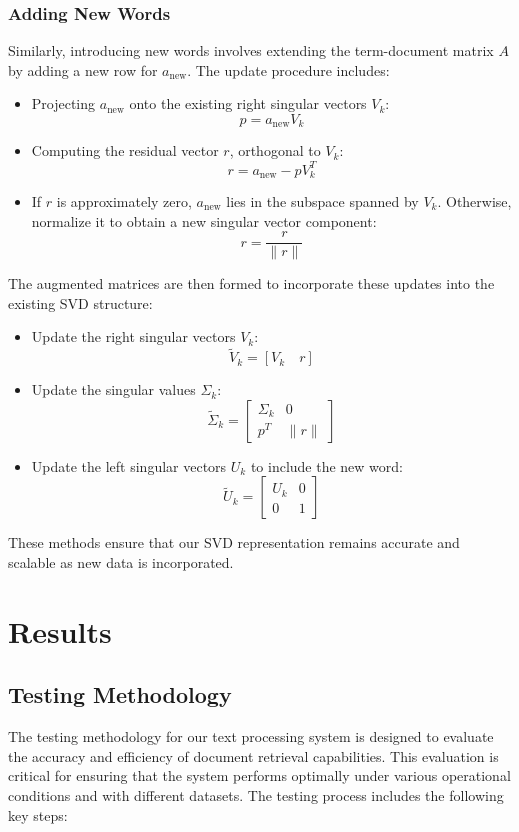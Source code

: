 \documentclass[12pt,a4paper]{article}
\begin{document}
\subsubsection{Adding New Words}
Similarly, introducing new words involves extending the term-document matrix $A$ by adding a new row for $a_{\text{new}}$. The update procedure includes:
\begin{itemize}
    \item Projecting $a_{\text{new}}$ onto the existing right singular vectors $V_k$: 
    \[
    p = a_{\text{new}} V_k
    \]
    \item Computing the residual vector $r$, orthogonal to $V_k$: 
    \[
    r = a_{\text{new}} - p V_k^T
    \]
    \item If $r$ is approximately zero, $a_{\text{new}}$ lies in the subspace spanned by $V_k$. Otherwise, normalize it to obtain a new singular vector component: 
    \[
    r = \frac{r}{\|r\|}
    \]
\end{itemize}
The augmented matrices are then formed to incorporate these updates into the existing SVD structure:
\begin{itemize}
    \item Update the right singular vectors $V_k$:
    \[
    \tilde{V}_k = [V_k \quad r]
    \]
    \item Update the singular values $\Sigma_k$:
    \[
    \tilde{\Sigma}_k = \begin{bmatrix}
    \Sigma_k & 0 \\
    p^T & \|r\|
    \end{bmatrix}
    \]
    \item Update the left singular vectors $U_k$ to include the new word:
    \[
    \tilde{U}_k = \begin{bmatrix}
    U_k & 0 \\
    0 & 1
    \end{bmatrix}
    \]
\end{itemize}
These methods ensure that our SVD representation remains accurate and scalable as new data is incorporated.

\newpage
\section{Results}

\subsection{Testing Methodology}
The testing methodology for our text processing system is designed to evaluate the accuracy and efficiency of document retrieval capabilities. This evaluation is critical for ensuring that the system performs optimally under various operational conditions and with different datasets. The testing process includes the following key steps:
\end{document}
